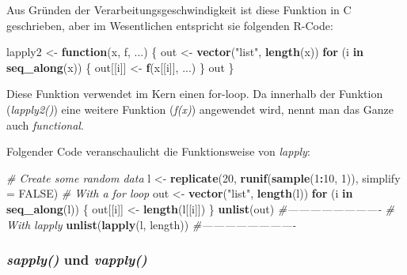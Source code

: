 \documentclass[]{article}
\newenvironment{Shaded}{\begin{snugshade}}{\end{snugshade}}
\newcommand{\KeywordTok}[1]{\textcolor[rgb]{0.13,0.29,0.53}{\textbf{#1}}}
\newcommand{\DataTypeTok}[1]{\textcolor[rgb]{0.13,0.29,0.53}{#1}}
\newcommand{\DecValTok}[1]{\textcolor[rgb]{0.00,0.00,0.81}{#1}}
\newcommand{\StringTok}[1]{\textcolor[rgb]{0.31,0.60,0.02}{#1}}
\newcommand{\CommentTok}[1]{\textcolor[rgb]{0.56,0.35,0.01}{\textit{#1}}}
\newcommand{\OtherTok}[1]{\textcolor[rgb]{0.56,0.35,0.01}{#1}}
\newcommand{\ControlFlowTok}[1]{\textcolor[rgb]{0.13,0.29,0.53}{\textbf{#1}}}
\newcommand{\OperatorTok}[1]{\textcolor[rgb]{0.81,0.36,0.00}{\textbf{#1}}}
\newcommand{\NormalTok}[1]{#1}
\begin{document}
Aus Gründen der Verarbeitungsgeschwindigkeit ist diese Funktion in C
geschrieben, aber im Wesentlichen entspricht sie folgenden R-Code:

\begin{Shaded}
\begin{Highlighting}[]
\NormalTok{lapply2 <-}\StringTok{ }\ControlFlowTok{function}\NormalTok{(x, f, ...) \{}
\NormalTok{  out <-}\StringTok{ }\KeywordTok{vector}\NormalTok{(}\StringTok{"list"}\NormalTok{, }\KeywordTok{length}\NormalTok{(x))}
  \ControlFlowTok{for}\NormalTok{ (i }\ControlFlowTok{in} \KeywordTok{seq_along}\NormalTok{(x)) \{}
\NormalTok{    out[[i]] <-}\StringTok{ }\KeywordTok{f}\NormalTok{(x[[i]], ...)}
\NormalTok{  \}}
\NormalTok{  out}
\NormalTok{\}}
\end{Highlighting}
\end{Shaded}

Diese Funktion verwendet im Kern einen for-loop. Da innerhalb der
Funktion (\emph{lapply2()}) eine weitere Funktion (\emph{f(x)})
angewendet wird, nennt man das Ganze auch \emph{functional}.

Folgender Code veranschaulicht die Funktionsweise von \emph{lapply}:

\begin{Shaded}
\begin{Highlighting}[]
\CommentTok{# Create some random data}
\NormalTok{  l <-}\StringTok{ }\KeywordTok{replicate}\NormalTok{(}\DecValTok{20}\NormalTok{, }\KeywordTok{runif}\NormalTok{(}\KeywordTok{sample}\NormalTok{(}\DecValTok{1}\OperatorTok{:}\DecValTok{10}\NormalTok{, }\DecValTok{1}\NormalTok{)), }\DataTypeTok{simplify =} \OtherTok{FALSE}\NormalTok{)}
\CommentTok{# With a for loop}
\NormalTok{  out <-}\StringTok{ }\KeywordTok{vector}\NormalTok{(}\StringTok{"list"}\NormalTok{, }\KeywordTok{length}\NormalTok{(l))}
  \ControlFlowTok{for}\NormalTok{ (i }\ControlFlowTok{in} \KeywordTok{seq_along}\NormalTok{(l)) \{}
\NormalTok{    out[[i]] <-}\StringTok{ }\KeywordTok{length}\NormalTok{(l[[i]])}
\NormalTok{  \}}
  \KeywordTok{unlist}\NormalTok{(out)}
\CommentTok{#-------------------------}
\CommentTok{# With lapply}
  \KeywordTok{unlist}\NormalTok{(}\KeywordTok{lapply}\NormalTok{(l, length))}
\CommentTok{#-------------------------  }
\end{Highlighting}
\end{Shaded}

\subsubsection*{\texorpdfstring{\emph{sapply()} und
\emph{vapply()}}{sapply() und vapply()}}\label{sapply-und-vapply}
\end{document}
